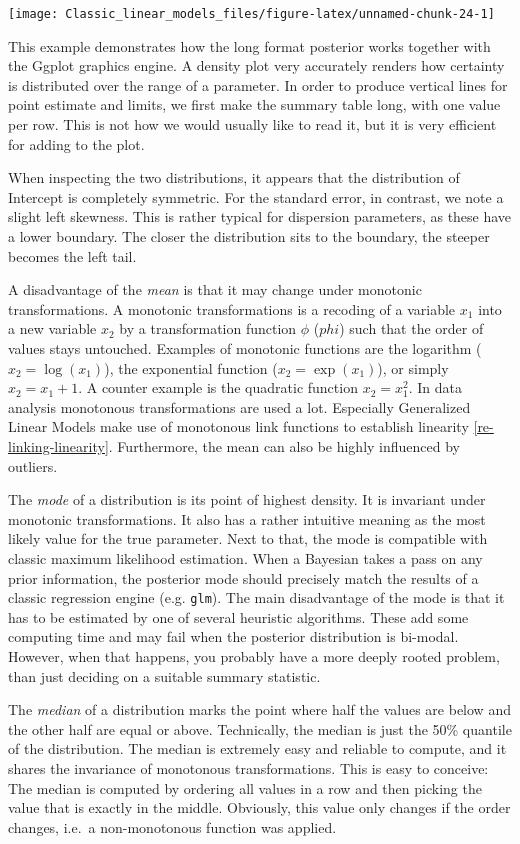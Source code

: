 \documentclass[]{svmono}
\begin{document}
\texttt{[image: Classic\_linear\_models\_files/figure-latex/unnamed-chunk-24-1]}

This example demonstrates how the long format posterior works together
with the Ggplot graphics engine. A density plot very accurately renders
how certainty is distributed over the range of a parameter. In order to
produce vertical lines for point estimate and limits, we first make the
summary table long, with one value per row. This is not how we would
usually like to read it, but it is very efficient for adding to the
plot.

When inspecting the two distributions, it appears that the distribution
of Intercept is completely symmetric. For the standard error, in
contrast, we note a slight left skewness. This is rather typical for
dispersion parameters, as these have a lower boundary. The closer the
distribution sits to the boundary, the steeper becomes the left tail.

A disadvantage of the \emph{mean} is that it may change under monotonic
transformations. A monotonic transformations is a recoding of a variable
\(x_1\) into a new variable \(x_2\) by a transformation function
\(\phi\) (\(phi\)) such that the order of values stays untouched.
Examples of monotonic functions are the logarithm (\(x_2 = \log(x_1)\)),
the exponential function (\(x_2 = \exp(x_1)\)), or simply
\(x_2 = x_1 + 1\). A counter example is the quadratic function
\(x_2 = x_1^2\). In data analysis monotonous transformations are used a
lot. Especially Generalized Linear Models make use of monotonous link
functions to establish linearity \ref{re-linking-linearity}.
Furthermore, the mean can also be highly influenced by outliers.

The \emph{mode} of a distribution is its point of highest density. It is
invariant under monotonic transformations. It also has a rather
intuitive meaning as the most likely value for the true parameter. Next
to that, the mode is compatible with classic maximum likelihood
estimation. When a Bayesian takes a pass on any prior information, the
posterior mode should precisely match the results of a classic
regression engine (e.g. \texttt{glm}). The main disadvantage of the mode
is that it has to be estimated by one of several heuristic algorithms.
These add some computing time and may fail when the posterior
distribution is bi-modal. However, when that happens, you probably have
a more deeply rooted problem, than just deciding on a suitable summary
statistic.

The \emph{median} of a distribution marks the point where half the
values are below and the other half are equal or above. Technically, the
median is just the 50\% quantile of the distribution. The median is
extremely easy and reliable to compute, and it shares the invariance of
monotonous transformations. This is easy to conceive: The median is
computed by ordering all values in a row and then picking the value that
is exactly in the middle. Obviously, this value only changes if the
order changes, i.e.~a non-monotonous function was applied.
\end{document}
